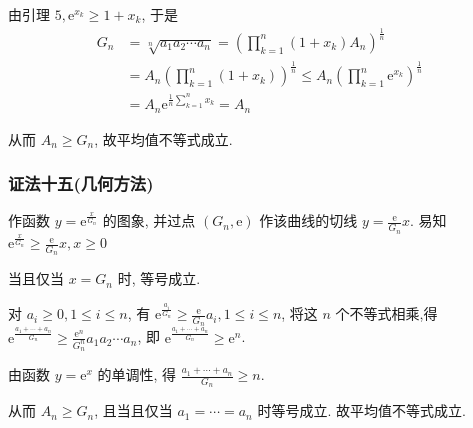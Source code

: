 由引理 $5, \mathrm{e}^{x_{k}} \geqslant 1+x_{k}$, 于是
$$
\begin{aligned}
G_{n} & =\sqrt[n]{a_{1} a_{2} \cdots a_{n}}=\left(\prod_{k=1}^{n}\left(1+x_{k}\right) A_{n}\right)^{\frac{1}{n}} \\
& =A_{n}\left(\prod_{k=1}^{n}\left(1+x_{k}\right)\right)^{\frac{1}{n}} \leqslant A_{n}\left(\prod_{k=1}^{n} \mathrm{e}^{x_{k}}\right)^{\frac{1}{n}} \\
& =A_{n} \mathrm{e}^{\frac{1}{n} \sum_{k=1}^{n} x_{k}}=A_{n}
\end{aligned}
$$

从而 $A_{n} \geqslant G_{n}$, 故平均值不等式成立.

\subsubsection*{证法十五(几何方法)}

作函数 $y=\mathrm{e}^{\frac{x}{G_{n}}}$ 的图象, 并过点 $\left(G_{n}, \mathrm{e}\right)$ 作该曲线的切线 $y=\frac{\mathrm{e}}{G_{n}} x$. 易知 $\mathrm{e}^{\frac{x}{G_{n}}} \geqslant \frac{\mathrm{e}}{G_{n}} x, x \geqslant 0$

当且仅当 $x=G_{n}$ 时, 等号成立.

对 $a_{i} \geqslant 0,1 \leqslant i \leqslant n$, 有 $\mathrm{e}^{\frac{a_{i}}{G_{n}}} \geqslant \frac{\mathrm{e}}{G_{n}} a_{i}, 1 \leqslant i \leqslant n$, 将这 $n$ 个不等式相乘,得 $\mathrm{e}^{\frac{a_{1}+\cdots+a_{n}}{G_{n}}} \geqslant \frac{\mathrm{e}^{n}}{G_{n}^{n}} a_{1} a_{2} \cdots a_{n}$, 即 $\mathrm{e}^{\frac{a_{1}+\cdots+a_{n}}{G_{n}}} \geqslant \mathrm{e}^{n}$.

由函数 $y=\mathrm{e}^{x}$ 的单调性, 得 $\frac{a_{1}+\cdots+a_{n}}{G_{n}} \geqslant n$.

从而 $A_{n} \geqslant G_{n}$, 且当且仅当 $a_{1}=\cdots=a_{n}$ 时等号成立. 故平均值不等式成立.

